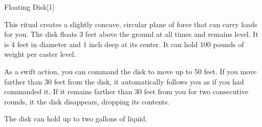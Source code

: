 \begin{spellsection}{Floating Disk}[1]
    \begin{spellheader}
    \end{spellheader}
    \begin{spellcontent}
        \begin{spelltargetinginfo}
            \spellrng{\rngmed}
        \end{spelltargetinginfo}
        \begin{spelleffects}

            \spellline
            \spelleffect This ritual creates a slightly concave, circular plane of force that can carry loads for you. The disk floats 3 feet above the ground at all times and remains level. It is 4 feet in diameter and 1 inch deep at its center. It can hold 100 pounds of weight per caster level.

            As a swift action, you can command the disk to move up to 50 feet. If you move farther than 30 feet from the disk, it automatically follows you as if you had commanded it. If it remains farther than 30 feet from you for two consecutive rounds, it the disk disappears, dropping its contents.
            \spelldur \durext \dismissable
        \end{spelleffects}
    \end{spellcontent}
    \begin{spellfooter}
        \spellnotes The disk can hold up to two gallons of liquid.
    \end{spellfooter}
\end{spellsection}

